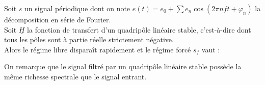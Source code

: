 \documentclass[a4paper]{article}
\begin{document}
\pagestyle{fancy}
\fancyhf{}
\setlength{\headheight}{15pt}

\begin{center}
	\large{}
\end{center}


Soit \(s\) un signal périodique dont on note \(e(t)=e_0+\sum e_n\cos(2\pi nft+\varphi_n)\) la décomposition en série de Fourier.\\
Soit \(\underline{H}\) la fonction de transfert d'un quadripôle linéaire stable, c'est-à-dire dont tous les pôles sont à partie réelle strictement négative.\\
Alors le régime libre disparaît rapidement et le régime forcé \(s_f\) vaut :\begin{center}
\end{center}
On remarque que le signal filtré par un quadripôle linéaire stable possède la même richesse spectrale que le signal entrant.
\end{document}
